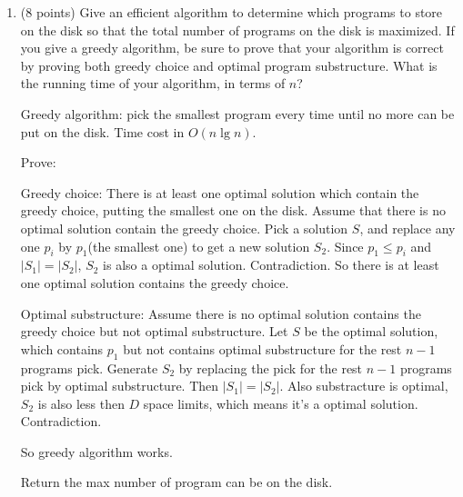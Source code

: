 \documentclass[paper=a4, fontsize=11pt]{scrartcl} %
\begin{document}
\begin{enumerate}
\item
  \begin{fancyquotes}
    (8 points) Give an efficient algorithm to determine which programs
    to store on the disk so that the total number of programs on the
    disk is maximized. If you give a greedy algorithm, be sure to
    prove that your algorithm is correct by proving both greedy choice
    and optimal program substructure. What is the running time of
    your algorithm, in terms of $n$?
  \end{fancyquotes}

  Greedy algorithm: pick the smallest program every time until no more
  can be put on the disk. Time cost in $O(n\lg{n})$.

  Prove:

  Greedy choice:
  There is at least one optimal solution which contain the greedy
  choice, putting the smallest one on the disk. Assume that there is
  no optimal solution contain the greedy choice. Pick a solution $S$,
  and replace any one $p_i$ by $p_1$(the smallest one) to get a new
  solution $S_2$. Since $p_1\leq p_i$ and $|S_1| = |S_2|$, $S_2$ is
  also a optimal solution. Contradiction. So there is at least one
  optimal solution contains the greedy choice.

  Optimal substructure:
  Assume there is no optimal solution contains the greedy choice but
  not optimal substructure.
  Let $S$ be the optimal solution, which contains $p_1$ but not
  contains optimal substructure for the rest $n-1$ programs
  pick. Generate $S_2$ by replacing the pick for the rest $n-1$
  programs pick by optimal substructure. Then $|S_1|=|S_2|$. Also
  substracture is optimal, $S_2$ is also less then $D$ space limits,
  which means it's a optimal solution. Contradiction.

  So greedy algorithm works.

  \begin{algorithm}[H]
    \caption{Return the max number of program can be on the disk.}
  \end{algorithm}



\end{enumerate}
\end{document}
